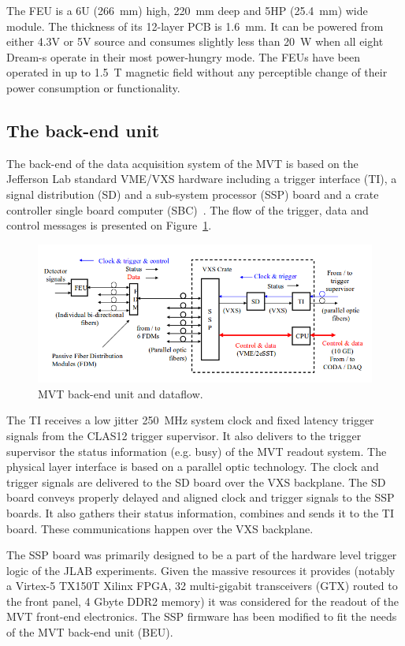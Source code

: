 The FEU is a 6U (266~mm) high, 220~mm deep and 5HP (25.4~mm) wide module. The thickness of its 12-layer PCB is 1.6~mm. It can be powered from either 4.3V or 5V source and consumes slightly less than 20~W when all eight Dream-s operate in their most power-hungry mode. The FEUs have been operated in up to 1.5~T magnetic field without any perceptible change of their power consumption or functionality.

\subsection{The back-end unit}
The back-end of the data acquisition system of the MVT is based on the Jefferson Lab standard VME/VXS hardware including a trigger interface (TI), a signal distribution (SD) and a sub-system processor (SSP) board and a crate controller single board computer (SBC)~\cite{nim:daq}. The flow of the trigger, data and control messages is presented on Figure~\ref{fig:mm-e_4}. 

\begin{figure}[htb]
 \includegraphics[width=1.0\columnwidth,keepaspectratio]{images/electronics_fig4.png}
 \caption{MVT back-end unit and dataflow.}
 \label{fig:mm-e_4}
\end{figure}

The TI receives a low jitter 250~MHz system clock and fixed latency trigger signals from the CLAS12 trigger supervisor. It also delivers to the trigger supervisor the status information (e.g. busy) of the MVT readout system. The physical layer interface is based on a parallel optic technology. The clock and trigger signals are delivered to the SD board over the VXS backplane. The SD board conveys properly delayed and aligned clock and trigger signals to the SSP boards. It also gathers their status information, combines and sends it to the TI board. These communications happen over the VXS backplane.

The SSP board was primarily designed to be a part of the hardware level trigger logic of the JLAB experiments. Given the massive resources it provides (notably a Virtex-5 TX150T Xilinx FPGA, 32 multi-gigabit transceivers (GTX) routed to the front panel, 4 Gbyte DDR2 memory) it was considered for the readout of the MVT front-end electronics. The SSP firmware has been modified to fit the needs of the MVT back-end unit (BEU).

